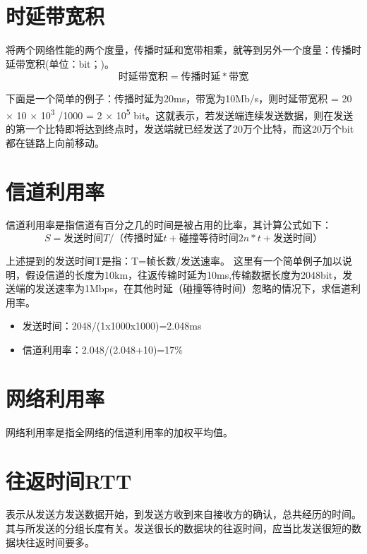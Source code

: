 \section{时延带宽积}
\label{时延带宽积}

将两个网络性能的两个度量，传播时延和宽带相乘，就等到另外一个度量：传播时延带宽积(单位：bit；)。
$$时延带宽积=传播时延*带宽$$

下面是一个简单的例子：传播时延为20ms，带宽为10Mb\slash s，则时延带宽积 = 20 × 10 × 10\textsuperscript{3} \slash 1000 = 2 × 10\textsuperscript{5} bit。这就表示，若发送端连续发送数据，则在发送的第一个比特即将达到终点时，发送端就已经发送了20万个比特，而这20万个bit都在链路上向前移动。

\section{信道利用率}
\label{信道利用率}

信道利用率是指信道有百分之几的时间是被占用的比率，其计算公式如下：
$$S=发送时间T /（传播时延t+碰撞等待时间2n*t+发送时间）$$

上述提到的发送时间T是指：T=帧长数\slash 发送速率。
这里有一个简单例子加以说明，假设信道的长度为10km，往返传输时延为10ms,传输数据长度为2048bit，发送端的发送速率为1Mbps，在其他时延（碰撞等待时间）忽略的情况下，求信道利用率。

\begin{itemize}
\item 发送时间：2048\slash (1x1000x1000)=2.048ms

\item 信道利用率：2.048\slash (2.048+10)=17\%

\end{itemize}

\section{网络利用率}
\label{网络利用率}

网络利用率是指全网络的信道利用率的加权平均值。

\section{往返时间RTT}
\label{往返时间rtt}

表示从发送方发送数据开始，到发送方收到来自接收方的确认，总共经历的时间。
其与所发送的分组长度有关。发送很长的数据块的往返时间，应当比发送很短的数据块往返时间要多。
